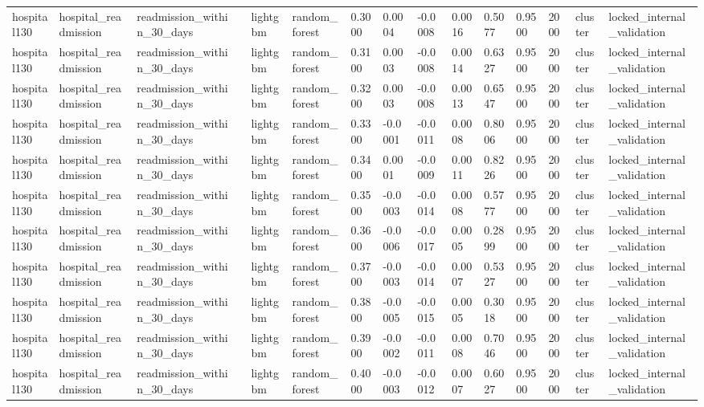 \begin{tabular}{lllllllllllllll}
hospital130 & hospital\_readmission & readmission\_within\_30\_days &  & lightgbm & random\_forest & 0.3000 & 0.0004 & -0.0008 & 0.0016 & 0.5077 & 0.9500 & 2000 & cluster & locked\_internal\_validation \\
hospital130 & hospital\_readmission & readmission\_within\_30\_days &  & lightgbm & random\_forest & 0.3100 & 0.0003 & -0.0008 & 0.0014 & 0.6327 & 0.9500 & 2000 & cluster & locked\_internal\_validation \\
hospital130 & hospital\_readmission & readmission\_within\_30\_days &  & lightgbm & random\_forest & 0.3200 & 0.0003 & -0.0008 & 0.0013 & 0.6547 & 0.9500 & 2000 & cluster & locked\_internal\_validation \\
hospital130 & hospital\_readmission & readmission\_within\_30\_days &  & lightgbm & random\_forest & 0.3300 & -0.0001 & -0.0011 & 0.0008 & 0.8006 & 0.9500 & 2000 & cluster & locked\_internal\_validation \\
hospital130 & hospital\_readmission & readmission\_within\_30\_days &  & lightgbm & random\_forest & 0.3400 & 0.0001 & -0.0009 & 0.0011 & 0.8226 & 0.9500 & 2000 & cluster & locked\_internal\_validation \\
hospital130 & hospital\_readmission & readmission\_within\_30\_days &  & lightgbm & random\_forest & 0.3500 & -0.0003 & -0.0014 & 0.0008 & 0.5777 & 0.9500 & 2000 & cluster & locked\_internal\_validation \\
hospital130 & hospital\_readmission & readmission\_within\_30\_days &  & lightgbm & random\_forest & 0.3600 & -0.0006 & -0.0017 & 0.0005 & 0.2899 & 0.9500 & 2000 & cluster & locked\_internal\_validation \\
hospital130 & hospital\_readmission & readmission\_within\_30\_days &  & lightgbm & random\_forest & 0.3700 & -0.0003 & -0.0014 & 0.0007 & 0.5327 & 0.9500 & 2000 & cluster & locked\_internal\_validation \\
hospital130 & hospital\_readmission & readmission\_within\_30\_days &  & lightgbm & random\_forest & 0.3800 & -0.0005 & -0.0015 & 0.0005 & 0.3018 & 0.9500 & 2000 & cluster & locked\_internal\_validation \\
hospital130 & hospital\_readmission & readmission\_within\_30\_days &  & lightgbm & random\_forest & 0.3900 & -0.0002 & -0.0011 & 0.0008 & 0.7046 & 0.9500 & 2000 & cluster & locked\_internal\_validation \\
hospital130 & hospital\_readmission & readmission\_within\_30\_days &  & lightgbm & random\_forest & 0.4000 & -0.0003 & -0.0012 & 0.0007 & 0.6027 & 0.9500 & 2000 & cluster & locked\_internal\_validation \\

\end{tabular}

